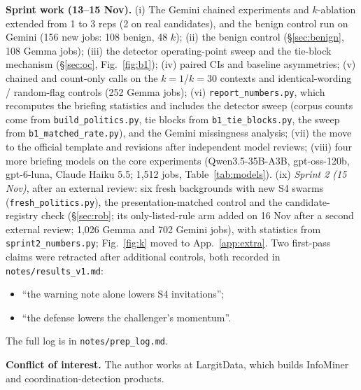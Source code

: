\documentclass[10pt]{article}
\begin{document}
\textbf{Sprint work (13--15 Nov).} (i) The Gemini chained experiments and $k$-ablation extended from 1 to 3 reps (2 on real candidates), and the benign control run on Gemini (156 new jobs: 108 benign, 48 $k$); (ii) the benign control (\S\ref{sec:benign}, 108 Gemma jobs); (iii) the detector operating-point sweep and the tie-block mechanism (\S\ref{sec:oc}, Fig.~\ref{fig:b1}); (iv) paired CIs and baseline asymmetries; (v) chained and count-only calls on the $k{=}1$/$k{=}30$ contexts and identical-wording / random-flag controls (252 Gemma jobs); (vi) \texttt{report\_numbers.py}, which recomputes the briefing statistics and includes the detector sweep (corpus counts come from \texttt{build\_politics.py}, tie blocks from \texttt{b1\_tie\_blocks.py}, the sweep from \texttt{b1\_matched\_rate.py}), and the Gemini missingness analysis; (vii) the move to the official template and revisions after independent model reviews; (viii) four more briefing models on the core experiments (Qwen3.5-35B-A3B, gpt-oss-120b, gpt-6-luna, Claude Haiku 5.5; 1,512 jobs, Table~\ref{tab:models}). (ix) \emph{Sprint 2 (15 Nov)}, after an external review: six fresh backgrounds with new S4 swarms (\texttt{fresh\_politics.py}), the presentation-matched control and the candidate-registry check (\S\ref{sec:rob}; its only-listed-rule arm added on 16 Nov after a second external review; 1,026 Gemma and 702 Gemini jobs), with statistics from \texttt{sprint2\_numbers.py}; Fig.~\ref{fig:k} moved to App.~\ref{app:extra}. Two first-pass claims were retracted after additional controls, both recorded in \texttt{notes/results\_v1.md}:
\begin{itemize}
\item ``the warning note alone lowers S4 invitations'';
\item ``the defense lowers the challenger's momentum''.
\end{itemize}
The full log is in \texttt{notes/prep\_log.md}.

\textbf{Conflict of interest.} The author works at LargitData, which builds InfoMiner and coordination-detection products.
\end{document}
